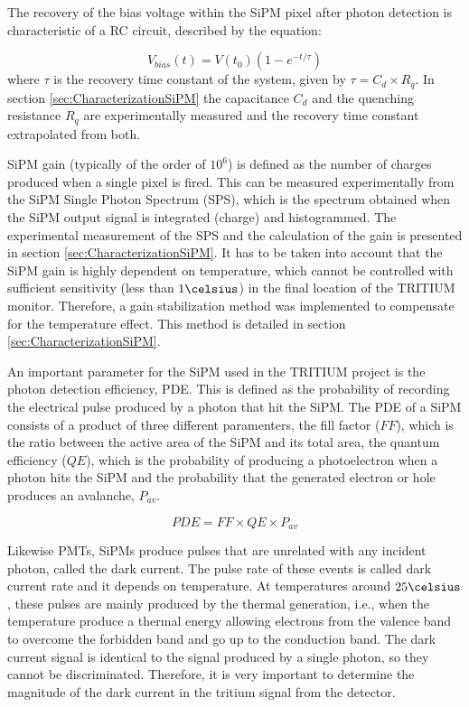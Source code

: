 The recovery of the bias voltage within the SiPM pixel after photon detection is characteristic of a RC circuit, described by the equation: 

\begin{equation}
V_{bias}(t)=V(t_0)\left(1-e^{-t/\tau} \right)
\label{RCCircuitBiasVoltage}
\end{equation}
where $\tau$ is the recovery time constant of the system, given by $\tau=C_d \times R_q$. In section \ref{sec:CharacterizationSiPM} the capacitance $C_d$ and the quenching resistance $R_q$ are experimentally measured and the recovery time constant extrapolated from both.

SiPM gain (typically of the order of $10^6$) is defined as the number of charges produced when a single pixel is fired. This can be measured experimentally from the SiPM Single Photon Spectrum (SPS), which is the spectrum obtained when the SiPM output signal is integrated (charge) and histogrammed. The experimental measurement of the SPS and the calculation of the gain is presented in section \ref{sec:CharacterizationSiPM}. It has to be taken into account that the SiPM gain is highly dependent on temperature, which cannot be controlled with sufficient sensitivity (less than $1\celsius$) in the final location of the TRITIUM monitor. Therefore, a gain stabilization method was implemented to compensate for the temperature effect. This method is detailed in section \ref{sec:CharacterizationSiPM}.

An important parameter for the SiPM used in the TRITIUM project is the photon detection efficiency, PDE. This is defined as the probability of recording the electrical pulse produced by a photon that hit the SiPM. The PDE of a SiPM consists of a product of three different paramenters, the fill factor ($FF$), which is the ratio between the active area of the SiPM and its total area, the quantum efficiency ($QE$), which is the probability of producing a photoelectron when a photon hits the SiPM and the probability that the generated electron or hole produces an avalanche, $P_{av}$.

\begin{equation}
PDE=FF \times QE \times P_{av}
\label{PDE_SiPM}
\end{equation}

Likewise PMTs, SiPMs produce pulses that are unrelated with any incident photon, called the dark current. The pulse rate of these events is called dark current rate and it depends on temperature. At temperatures around $25\celsius$, these pulses are mainly produced by the thermal generation, i.e., when the temperature produce a thermal energy allowing electrons from the valence band to overcome the forbidden band and go up to the conduction band. The dark current signal is identical to the signal produced by a single photon, so they cannot be discriminated. Therefore, it is very important to determine the magnitude of the dark current in the tritium signal from the detector.

